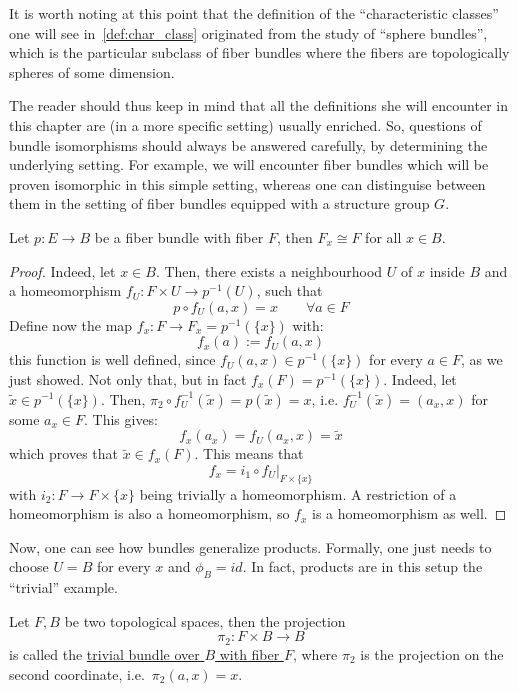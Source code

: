 It is worth noting at this point that the definition of the ``characteristic classes'' one will see in~\ref{def:char_class} originated from the study of ``sphere bundles'', which is the particular subclass of fiber bundles where the fibers are topologically spheres of some dimension.

The reader should thus keep in mind that all the definitions she will encounter in this chapter are (in a more specific setting) usually enriched. So, questions of bundle isomorphisms should always be answered carefully, by determining the underlying setting. For example, we will encounter fiber bundles which will be proven isomorphic in this simple setting, whereas one can distinguise between them in the setting of fiber bundles equipped with a structure group $G$.

\begin{proposition}\label{prop:same_fiber} Let $p:E\to B$ be a fiber bundle with fiber $F$, then $F_x\cong F$ for all $x\in B$.
\end{proposition}
\begin{proof}
Indeed, let $x\in B$. Then, there exists a neighbourhood $U$ of $x$ inside $B$ and a homeomorphism $f_U:F\times U\to p^{-1}(U)$, such that
\[p\circ f_U(a,x)=x\qquad \forall a\in F\]
Define now the map $f_x:F\to F_x=p^{-1}(\{x\})$ with:
\[f_x(a):=f_U(a,x)\]
this function is well defined, since $f_U(a,x)\in p^{-1}(\{x\})$ for every $a\in F$, as we just showed. Not only that, but in fact $f_x(F)=p^{-1}(\{x\})$. Indeed, let $\tilde{x}\in p^{-1}(\{x\})$. Then, $\pi_2\circ f_U^{-1}(\tilde{x})=p(\tilde{x})=x$, i.e. $f_U^{-1}(\tilde{x})=(a_x,x)$ for some $a_x\in F$. This gives:
\[f_x(a_x)=f_U(a_x,x)=\tilde{x}\]
which proves that $\tilde{x}\in f_x(F)$. This means that
\[f_x=i_1\circ f_U|_{F\times\{x\}}\]
with $i_2:F\to F\times\{x\}$ being trivially a homeomorphism. A restriction of a homeomorphism is also a homeomorphism, so $f_x$ is a homeomorphism as well.
\end{proof}

Now, one can see how bundles generalize products. Formally, one just needs to choose $U=B$ for every $x$ and $\phi_B=id$. In fact, products are in this setup the ``trivial'' example.
\begin{definition} Let $F, B$ be two topological spaces, then the projection
\[\pi_2:F\times B\to B\]
is called the \ul{trivial bundle over $B$ with fiber $F$}, where $\pi_2$ is the projection on the second coordinate, i.e.\ $\pi_2(a,x)=x$.
\end{definition}

